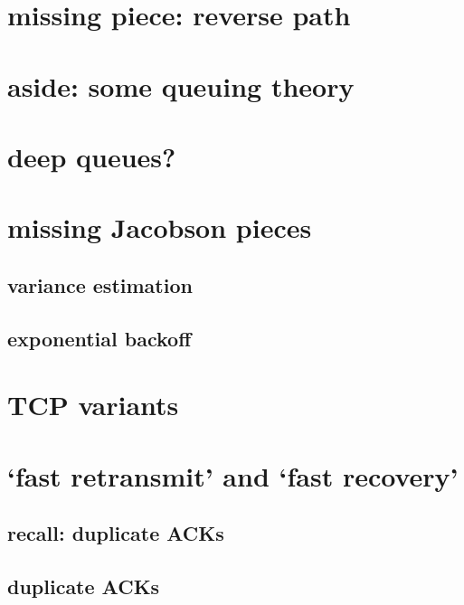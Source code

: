 \section{missing piece: reverse path}


\section{aside: some queuing theory}


\section{deep queues?}


\section{missing Jacobson pieces}
\subsection{variance estimation}


\subsection{exponential backoff}


\section{TCP variants}



\section{`fast retransmit' and `fast recovery'}

\subsection{recall: duplicate ACKs}


\subsection{duplicate ACKs}


